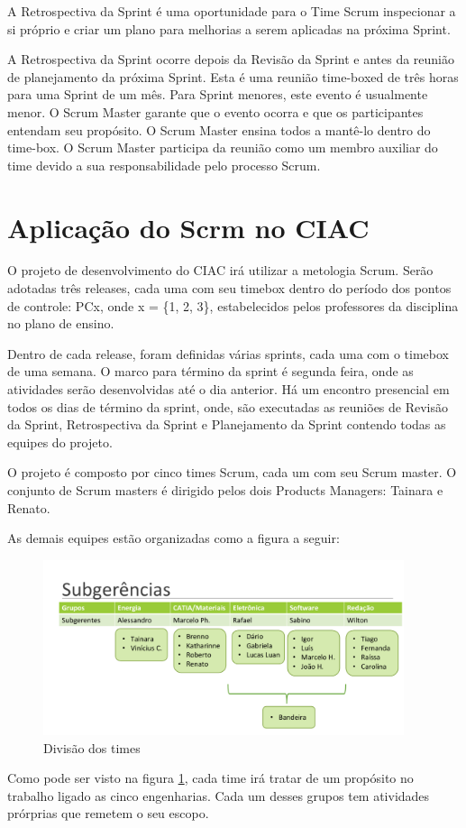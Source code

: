 A Retrospectiva da Sprint é uma oportunidade para o Time Scrum inspecionar a si próprio e
criar um plano para melhorias a serem aplicadas na próxima Sprint.

A Retrospectiva da Sprint ocorre depois da Revisão da Sprint e antes da reunião de
planejamento da próxima Sprint. Esta é uma reunião time-boxed de três horas para uma Sprint
de um mês. Para Sprint menores, este evento é usualmente menor. O Scrum Master garante
que o evento ocorra e que os participantes entendam seu propósito. O Scrum Master ensina
todos a mantê-lo dentro do time-box. O Scrum Master participa da reunião como um membro
auxiliar do time devido a sua responsabilidade pelo processo Scrum.

\section{Aplicação do Scrm no CIAC}
O projeto de desenvolvimento do CIAC irá utilizar a metologia Scrum.
Serão adotadas três releases, cada uma com seu timebox dentro do período dos pontos
de controle: PCx, onde x = \{1, 2, 3\}, estabelecidos pelos professores da disciplina no plano de ensino.

Dentro de cada release, foram definidas várias sprints, cada uma com o timebox
de uma semana. O marco para término da sprint é segunda feira, onde as atividades
serão desenvolvidas até o dia anterior. Há um encontro presencial em todos os dias
de término da sprint, onde, são executadas as reuniões de Revisão da Sprint,
Retrospectiva da Sprint e Planejamento da Sprint contendo todas as equipes
do projeto.

O projeto é composto por cinco times Scrum, cada um com seu Scrum master.
O conjunto de Scrum masters é dirigido pelos dois Products Managers: Tainara e Renato.

As demais equipes estão organizadas como a figura a seguir:
\begin{figure}[h]
  \centering
  \includegraphics[width=400px, scale=1]{figuras/time}
  \caption{Divisão dos times}
\label{fig:time}
\end{figure}
Como pode ser visto na figura \ref{fig:time}, cada time irá tratar de um propósito no trabalho
ligado as cinco engenharias.
Cada um desses grupos tem atividades prórprias que remetem o seu escopo.

